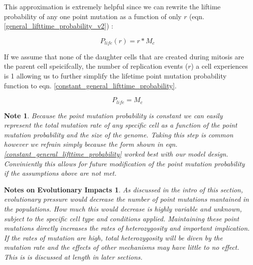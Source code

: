 \documentclass{article}
\newtheorem{evo_impacts}{Notes on Evolutionary Impacts}
\newtheorem{note}{Note}
\begin{document}
    This approximation is extremely helpful since we can rewrite the liftime probability of any one point mutation as a function of only \(r\) (eqn. \ref{general_lifttime_probability_v2}) :

    \begin{equation}
        P_{life}(r) = r * M_c \label{general_lifttime_probability_v2}
    \end{equation}

    If we assume that none of the daughter cells that are created during mitosis are the parent cell speicifcally, the number of replication events (\(r\)) a cell experiences is 1 allowing us to further simplify the lifetime point mutation probability function to eqn. \ref{constant_general_lifttime_probability}.

    \begin{equation}
        P_{life} = M_c \label{constant_general_lifttime_probability}
    \end{equation}

    \begin{note}
        Because the point mutation probability is constant we can easily represent the total mutation rate of any specific cell as a function of the point mutation probability and the size of the genome.  Taking this step is common however we refrain simply because the form shown in eqn. \ref{constant_general_lifttime_probability} worked best with our model design.  Conviniently this allows for future modification of the point mutation probability if the assumptions above are not met.
    \end{note}

    \begin{evo_impacts}
        As discussed in the intro of this section, evolutionary pressure would decrease the number of point mutations mantained in the populations.  How much this would decrease is highly variable and unknown, subject to the specific cell type and conditions applied.  Maintaining these point mutations directly increases the rates of heterozygosity and important implication.  If the rates of mutation are high, total heterozygosity will be diven by the mutation rate and the effects of other mechanisms may have little to no effect.  This is  is discussed at length in later sections.
    \end{evo_impacts}

\end{document}
